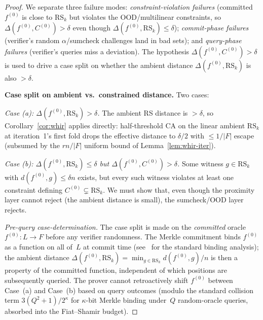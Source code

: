 \documentclass[11pt]{article}
\newcommand{\RS}{\mathrm{RS}}
\begin{document}
\begin{proof}
We separate three failure modes: \emph{constraint-violation failures} (committed $f^{(0)}$ is close to $\RS_k$ but violates the OOD/multilinear constraints, so $\Delta(f^{(0)}, C^{(0)}) > \delta$ even though $\Delta(f^{(0)}, \RS_k) \leq \delta$); \emph{commit-phase failures} (verifier's random $\alpha$/sumcheck challenges land in bad sets); and \emph{query-phase failures} (verifier's queries miss a deviation). The hypothesis $\Delta(f^{(0)}, C^{(0)}) > \delta$ is used to drive a case split on whether the ambient distance $\Delta(f^{(0)}, \RS_k)$ is also $> \delta$.

\textbf{Case split on ambient vs.\ constrained distance.} Two cases:

\emph{Case (a): $\Delta(f^{(0)}, \RS_k) > \delta$.} The ambient RS distance is $> \delta$, so Corollary~\ref{cor:whir} applies directly: half-threshold CA on the linear ambient $\RS_k$ at iteration~1's first fold drops the effective distance to $\delta/2$ with $\leq 1/|F|$ escape (subsumed by the $rn/|F|$ uniform bound of Lemma~\ref{lem:whir-iter}).

\emph{Case (b): $\Delta(f^{(0)}, \RS_k) \leq \delta$ but $\Delta(f^{(0)}, C^{(0)}) > \delta$.} Some witness $g \in \RS_k$ with $d(f^{(0)}, g) \leq \delta n$ exists, but every such witness violates at least one constraint defining $C^{(0)} \subsetneq \RS_k$. We must show that, even though the proximity layer cannot reject (the ambient distance is small), the sumcheck/OOD layer rejects.

\emph{Pre-query case-determination.} The case split is made on the \emph{committed} oracle $f^{(0)}: L \to F$ before any verifier randomness. The Merkle commitment binds $f^{(0)}$ as a function on all of~$L$ at commit time (see~\cite{BBHR,WHIR} for the standard binding analysis); the ambient distance $\Delta(f^{(0)}, \RS_k) = \min_{g \in \RS_k} d(f^{(0)}, g)/n$ is then a property of the committed function, independent of which positions are subsequently queried. The prover cannot retroactively shift $f^{(0)}$ between Case~(a) and Case~(b) based on query outcomes (modulo the standard collision term $3(Q^2{+}1)/2^\kappa$ for $\kappa$-bit Merkle binding under~$Q$ random-oracle queries, absorbed into the Fiat--Shamir budget).


\end{proof}
\end{document}
